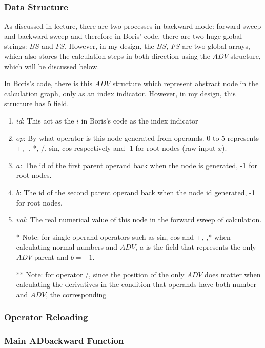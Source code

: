 \subsubsection{Data Structure}
As discussed in lecture, there are two processes in backward mode: forward sweep and backward sweep and therefore in Boris' code, there are two
huge global strings: $BS$ and $FS$. However, in my design, the $BS$, $FS$ are two global arrays, which also
stores the calculation steps in both direction using the $ADV$ structure, which will be discussed below.

In Boris's code, there is this $ADV$ structure which represent abstract node in the calculation graph, only as an index
indicator. However, in my design, this structure has 5 field.
\begin{enumerate}
    \item $id$: This act as the $i$ in Boris's code as the index indicator
    \item $op$: By what operator is this node generated from operands. 0 to 5 represents +, -, *, /, sin, cos
    respectively and -1 for root nodes (raw input $x$).
    \item $a$: The id of the first parent operand back when the node is generated, -1 for root nodes.
    \item $b$: The id of the second parent operand back when the node id generated, -1 for root nodes.
    \item $val$: The real numerical value of this node in the forward sweep of calculation.
    \item[*] Note: for single operand operators such as sin, cos and +,-,* when calculating normal numbers and $ADV$,
    $a$ is the field that represents the only $ADV$ parent and $b=-1$.
    \item[**] Note: for operator /, since the position of the only $ADV$ does matter when calculating the derivatives
    in the condition that operands have both number and $ADV$, the corresponding
\end{enumerate}

\subsubsection{Operator Reloading}
\subsubsection{Main ADbackward Function}